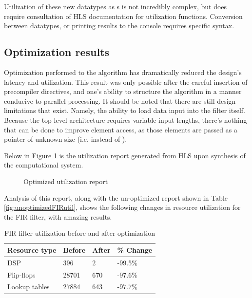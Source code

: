 \documentclass[11pt]{report}
\begin{document}
Utilization of these new datatypes as s is not incredibly complex, but does require consultation of HLS documentation for utilization functions. Conversion between datatypes, or printing results to the console requires specific syntax.

\subsection{Optimization results}

Optimization performed to the algorithm has dramatically reduced the design's latency and utilization. This result was only possible after the careful insertion of precompiler directives, and one's ability to structure the algorithm in a manner conducive to parallel processing. It should be noted that there are still design limitations that exist. Namely, the ability to load data input into the filter itself. Because the top-level architecture requires variable input lengths, there's nothing that can be done to improve element access, as those elements are passed as a pointer of unknown size (i.e.  instead of ).

Below in Figure \ref{optimizedFIRutil} is the utilization report generated from HLS upon synthesis of the computational system. 

 \begin{figure}[h!]
 	\begin{center}
 		\fboxsep=0mm
 		\caption{Optimized utilization report}
 		\label{optimizedFIRutil}
 	\end{center}
 \end{figure}
 \FloatBarrier
 
 Analysis of this report, along with the un-optimized report shown in Table \ref{fig:unoptimizedFIRutil}, shows the following changes in resource utilization for the FIR filter, with amazing results.
 
 
\begin{table}[h!]
    \centering
    
    \begin{tabular}{|l|l|l|l|}
        \hline
		\textbf{Resource type} & \textbf{Before} & \textbf{After} & \textbf{\% Change} \\
		\hline \hline
		DSP & 396 & 2 & -99.5\% \\
		\hline
		Flip-flops & 28701 & 670 & -97.6\% \\
		\hline
		Lookup tables & 27884 & 643 & -97.7\% \\
	\hline
		
    \end{tabular}
    \label{FIRresourceComparison}
    \caption{FIR filter utilization before and after optimization}
\end{table}
\FloatBarrier
\end{document}
